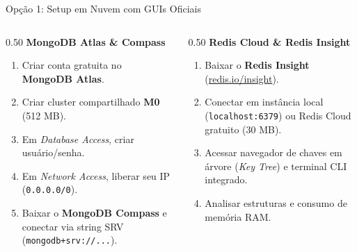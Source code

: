 \begin{frame}{Opção 1: Setup em Nuvem com GUIs Oficiais}
  \begin{columns}[T]
    \begin{column}{0.50\textwidth}
      \textbf{MongoDB Atlas \& Compass}
      {\footnotesize
      \begin{enumerate}
        \item Criar conta gratuita no \textbf{MongoDB Atlas}.
        \item Criar cluster compartilhado \textbf{M0} (512 MB).
        \item Em \textit{Database Access}, criar usuário/senha.
        \item Em \textit{Network Access}, liberar seu IP (\texttt{0.0.0.0/0}).
        \item Baixar o \textbf{MongoDB Compass} e conectar via string SRV (\texttt{mongodb+srv://...}).
      \end{enumerate}
      }
    \end{column}

    \begin{column}{0.50\textwidth}
      \textbf{Redis Cloud \& Redis Insight}
      {\footnotesize
      \begin{enumerate}
        \item Baixar o \textbf{Redis Insight} (\url{redis.io/insight}).
        \item Conectar em instância local (\texttt{localhost:6379}) ou Redis Cloud gratuito (30 MB).
        \item Acessar navegador de chaves em árvore (\textit{Key Tree}) e terminal CLI integrado.
        \item Analisar estruturas e consumo de memória RAM.
      \end{enumerate}
      }
    \end{column}
  \end{columns}
\end{frame}

